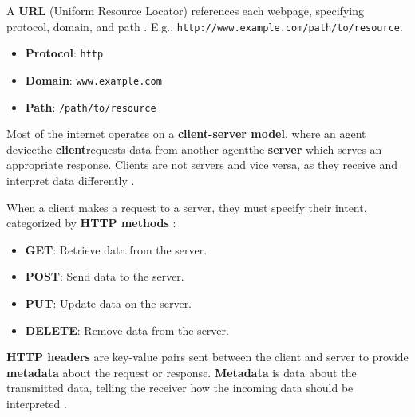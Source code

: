 \begin{Def}

    A \textbf{URL} (Uniform Resource Locator) references each webpage, specifying protocol, domain, and path \cite{w3c_html_href_draft}.
    E.g., \texttt{http://www.example.com/path/to/resource}.
    \begin{itemize}
        \item \textbf{Protocol}: \texttt{http}
        \item \textbf{Domain}: \texttt{www.example.com}
        \item \textbf{Path}: \texttt{/path/to/resource}
    \end{itemize}
\end{Def}
\begin{Def}

    Most of the internet operates on a \textbf{client-server model}, where an agent device\textendash the \textbf{client}\textendash requests data from another agent\textendash the \textbf{server}\textendash 
    which serves an appropriate response. Clients are not servers and vice versa, as they receive and interpret data differently \cite{cloudflare_client_server}.
\end{Def}

\begin{Def}
    
        When a client makes a request to a server, they must specify their intent, categorized by \textbf{HTTP methods} \cite{rfc2616}:
        \begin{itemize}
            \item \textbf{GET}: Retrieve data from the server.
            \item \textbf{POST}: Send data to the server.
            \item \textbf{PUT}: Update data on the server.
            \item \textbf{DELETE}: Remove data from the server.
        \end{itemize}
\end{Def}
\begin{Def}

    \textbf{HTTP headers} are key-value pairs sent between the client and server to provide \textbf{metadata} about the request or response.
    \textbf{Metadata} is data about the transmitted data, telling the receiver how the incoming data should be interpreted \cite{rfc2616}.
\end{Def}


